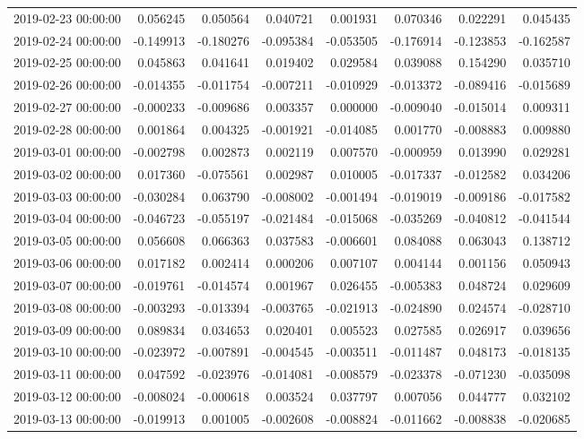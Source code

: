 \begin{tabular}{lrrrrrrr}
2019-02-23 00:00:00 & 0.056245 & 0.050564 & 0.040721 & 0.001931 & 0.070346 & 0.022291 & 0.045435 \\
2019-02-24 00:00:00 & -0.149913 & -0.180276 & -0.095384 & -0.053505 & -0.176914 & -0.123853 & -0.162587 \\
2019-02-25 00:00:00 & 0.045863 & 0.041641 & 0.019402 & 0.029584 & 0.039088 & 0.154290 & 0.035710 \\
2019-02-26 00:00:00 & -0.014355 & -0.011754 & -0.007211 & -0.010929 & -0.013372 & -0.089416 & -0.015689 \\
2019-02-27 00:00:00 & -0.000233 & -0.009686 & 0.003357 & 0.000000 & -0.009040 & -0.015014 & 0.009311 \\
2019-02-28 00:00:00 & 0.001864 & 0.004325 & -0.001921 & -0.014085 & 0.001770 & -0.008883 & 0.009880 \\
2019-03-01 00:00:00 & -0.002798 & 0.002873 & 0.002119 & 0.007570 & -0.000959 & 0.013990 & 0.029281 \\
2019-03-02 00:00:00 & 0.017360 & -0.075561 & 0.002987 & 0.010005 & -0.017337 & -0.012582 & 0.034206 \\
2019-03-03 00:00:00 & -0.030284 & 0.063790 & -0.008002 & -0.001494 & -0.019019 & -0.009186 & -0.017582 \\
2019-03-04 00:00:00 & -0.046723 & -0.055197 & -0.021484 & -0.015068 & -0.035269 & -0.040812 & -0.041544 \\
2019-03-05 00:00:00 & 0.056608 & 0.066363 & 0.037583 & -0.006601 & 0.084088 & 0.063043 & 0.138712 \\
2019-03-06 00:00:00 & 0.017182 & 0.002414 & 0.000206 & 0.007107 & 0.004144 & 0.001156 & 0.050943 \\
2019-03-07 00:00:00 & -0.019761 & -0.014574 & 0.001967 & 0.026455 & -0.005383 & 0.048724 & 0.029609 \\
2019-03-08 00:00:00 & -0.003293 & -0.013394 & -0.003765 & -0.021913 & -0.024890 & 0.024574 & -0.028710 \\
2019-03-09 00:00:00 & 0.089834 & 0.034653 & 0.020401 & 0.005523 & 0.027585 & 0.026917 & 0.039656 \\
2019-03-10 00:00:00 & -0.023972 & -0.007891 & -0.004545 & -0.003511 & -0.011487 & 0.048173 & -0.018135 \\
2019-03-11 00:00:00 & 0.047592 & -0.023976 & -0.014081 & -0.008579 & -0.023378 & -0.071230 & -0.035098 \\
2019-03-12 00:00:00 & -0.008024 & -0.000618 & 0.003524 & 0.037797 & 0.007056 & 0.044777 & 0.032102 \\
2019-03-13 00:00:00 & -0.019913 & 0.001005 & -0.002608 & -0.008824 & -0.011662 & -0.008838 & -0.020685 \\

\end{tabular}
